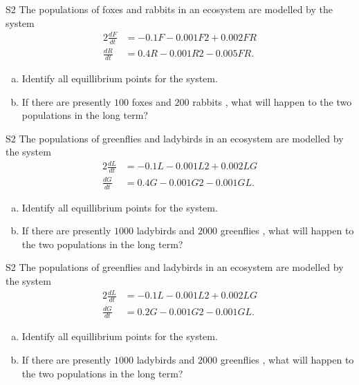 \begin{problem}{S2}
The populations of foxes and rabbits in an ecosystem are modelled by the system
\begin{alignat*}{2}
\frac{dF}{dt} &= -0.1F - 0.001F 2 + 0.002FR \\
\frac{dR}{dt} & = 0.4R − 0.001R 2 - 0.005FR.
\end{alignat*}
\begin{enumerate}[(a)]
\item Identify all equillibrium points for the system.
\item If there are presently \(100\) foxes and \(200\) rabbits , what will happen to the two populations in the long term?
\end{enumerate}
\end{problem}

\begin{problem}{S2}
The populations of greenflies and ladybirds in an ecosystem are modelled by the system
\begin{alignat*}{2}
\frac{dL}{dt} &= -0.1L - 0.001L 2 + 0.002LG \\
\frac{dG}{dt} & = 0.4G - 0.001G 2 - 0.001GL.
\end{alignat*}
\begin{enumerate}[(a)]
\item Identify all equillibrium points for the system.
\item If there are presently \(1000\) ladybirds and \(2000\) greenflies , what will happen to the two populations in the long term?
\end{enumerate}
\end{problem}

\begin{problem}{S2}
The populations of greenflies and ladybirds in an ecosystem are modelled by the system
\begin{alignat*}{2}
\frac{dL}{dt} &= -0.1L - 0.001L 2 + 0.002LG \\
\frac{dG}{dt} & = 0.2G - 0.001G 2 - 0.001GL.
\end{alignat*}
\begin{enumerate}[(a)]
\item Identify all equillibrium points for the system.
\item If there are presently \(1000\) ladybirds and \(2000\) greenflies , what will happen to the two populations in the long term?
\end{enumerate}
\end{problem}
